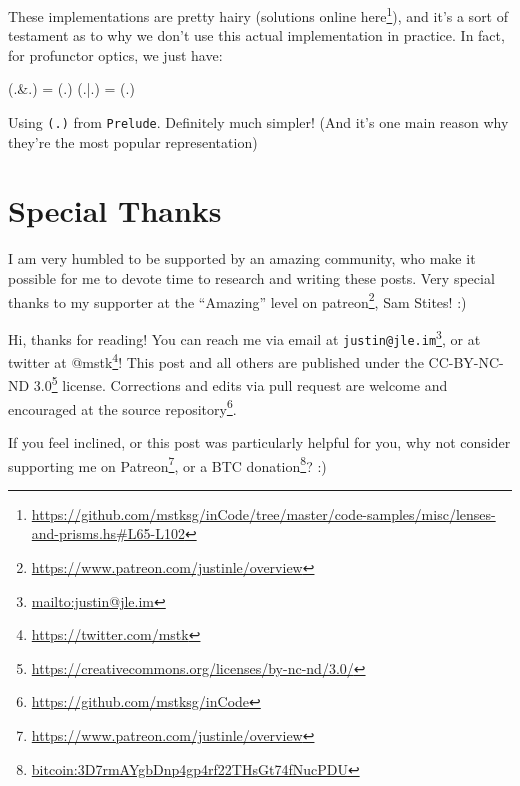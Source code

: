 \documentclass[]{article}
\newenvironment{Shaded}{}{}
\newcommand{\FunctionTok}[1]{\textcolor[rgb]{0.02,0.16,0.49}{#1}}
\newcommand{\NormalTok}[1]{#1}
\renewcommand{\href}[2]{#2\footnote{\url{#1}}}
\begin{document}
\begin{itemize}
  These implementations are pretty hairy (solutions
  \href{https://github.com/mstksg/inCode/tree/master/code-samples/misc/lenses-and-prisms.hs\#L65-L102}{online
  here}), and it's a sort of testament as to why we don't use this actual
  implementation in practice. In fact, for profunctor optics, we just have:

\begin{Shaded}
\begin{Highlighting}[]
\NormalTok{(}\FunctionTok{.&.}\NormalTok{) }\FunctionTok{=}\NormalTok{ (}\FunctionTok{.}\NormalTok{)}
\NormalTok{(}\FunctionTok{.|.}\NormalTok{) }\FunctionTok{=}\NormalTok{ (}\FunctionTok{.}\NormalTok{)}
\end{Highlighting}
\end{Shaded}

  Using \texttt{(.)} from \texttt{Prelude}. Definitely much simpler! (And it's
  one main reason why they're the most popular representation)
\end{itemize}

\hypertarget{special-thanks}{%
\section{Special Thanks}\label{special-thanks}}

I am very humbled to be supported by an amazing community, who make it possible
for me to devote time to research and writing these posts. Very special thanks
to my supporter at the ``Amazing'' level on
\href{https://www.patreon.com/justinle/overview}{patreon}, Sam Stites! :)

Hi, thanks for reading! You can reach me via email at
\href{mailto:justin@jle.im}{\nolinkurl{justin@jle.im}}, or at twitter at
\href{https://twitter.com/mstk}{@mstk}! This post and all others are published
under the \href{https://creativecommons.org/licenses/by-nc-nd/3.0/}{CC-BY-NC-ND
3.0} license. Corrections and edits via pull request are welcome and encouraged
at \href{https://github.com/mstksg/inCode}{the source repository}.

If you feel inclined, or this post was particularly helpful for you, why not
consider \href{https://www.patreon.com/justinle/overview}{supporting me on
Patreon}, or a \href{bitcoin:3D7rmAYgbDnp4gp4rf22THsGt74fNucPDU}{BTC donation}?
:)
\end{document}
